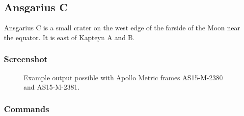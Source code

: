\subsection{Ansgarius C}

Ansgarius C is a small crater on the west edge of the farside of the
Moon near the equator. It is east of Kapteyn A and B.

\subsubsection*{Screenshot}

\begin{figure}[h!]
\centering
  \hfil
\caption{Example output possible with Apollo Metric frames AS15-M-2380 and AS15-M-2381.}
\label{fig:metric_example}
\end{figure}

\subsubsection*{Commands}

